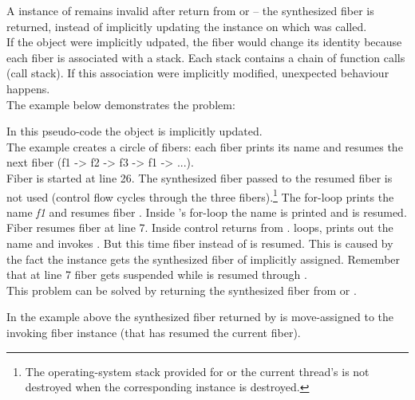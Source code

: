
\label{fiberreturn}
A instance of \fiber remains invalid after return from \resume or \resumewith --
the synthesized fiber is returned, instead of implicitly updating the \fiber
instance on which \resume was called.\\
If the \fiber object were implicitly udpated, the fiber would 
change its identity because each fiber is associated with a stack. Each stack
contains a chain of function calls (call stack). If this association were
implicitly modified, unexpected behaviour happens.\\
The example below demonstrates the problem:

In this pseudo-code the \fiber object is implicitly updated.\\
The example creates a circle of fibers: each fiber prints its name and resumes
the next fiber (f1 -> f2 -> f3 -> f1 -> ...).\\
Fiber  is started at line 26. The synthesized fiber  passed 
to the resumed fiber is not used (control flow cycles through the three
fibers).\footnote{The operating-system stack provided for \main or the current
thread's \entryfn\xspace is not destroyed when the corresponding \fiber instance is
destroyed.}
The for-loop prints the name \emph{f1} and resumes fiber . Inside 
's for-loop the name is printed and  is resumed. Fiber 
resumes fiber  at line 7. Inside  control returns from
.  loops, prints out the name and invokes . But
this time fiber  instead of  is resumed. This is caused by the
fact the instance  gets the synthesized fiber of  implicitly
assigned. Remember that at line 7 fiber  gets suspended while 
is resumed through .\\

This problem can be solved by returning the synthesized fiber from  \resume or
\resumewith. 

In the example above the synthesized fiber returned by \resume is
move-assigned to the invoking fiber instance (that has resumed the current
fiber).\\

